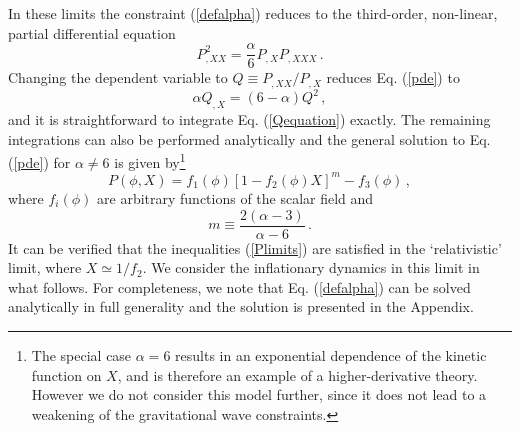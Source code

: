 In these limits the constraint (\ref{defalpha}) reduces to the 
third-order, non-linear, partial differential equation
\begin{equation}
\label{pde}
P^2_{,XX} = \frac{\alpha}{6} P_{,X} P_{,XXX} \,.
\end{equation}
Changing the dependent variable to $Q \equiv P_{,XX}/P_{,X}$ 
reduces Eq. (\ref{pde}) to 
\begin{equation}
\label{Qequation}
\alpha Q_{,X} = (6-\alpha )Q^2 \,,
\end{equation}
and it is straightforward to integrate Eq. (\ref{Qequation}) 
exactly. The remaining integrations can also be performed analytically 
and the general solution to Eq. (\ref{pde}) for $\alpha \ne
6$ is given by\footnote{The special case $\alpha =6$ results in an 
exponential dependence of the kinetic function on $X$, and is 
therefore an example of a higher-derivative theory. However we 
do not consider this model further, since it does not lead to a 
weakening of the gravitational wave constraints.}
\begin{equation}
\label{gensol}
P (\phi , X) = f_1 (\phi ) \left[ 1-f_2 (\phi ) X 
\right]^m -f_3(\phi ) \,,
\end{equation}
where $f_i (\phi )$ are arbitrary functions of the scalar 
field and 
\begin{equation}
m \equiv \frac{2(\alpha -3 )}{\alpha -6} \, . 
\end{equation}
It can be verified that the inequalities (\ref{Plimits}) 
are satisfied in the `relativistic' limit, where $X \simeq 1/f_2$.
We consider the inflationary dynamics in this limit in what follows. 
For completeness, we note that Eq. (\ref{defalpha}) can be solved 
analytically in 
full generality and the solution is presented in the Appendix. 


